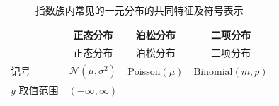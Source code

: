\documentclass[12pt,a4paper,UTF8,twoside]{book}
\theoremstyle{definition}
\theoremstyle{definition}
\theoremstyle{definition}
\theoremstyle{remark}
\begin{document}
\begin{longtable}[]{@{}lccc@{}}
\caption{\label{tab:common-characteristics}
指数族内常见的一元分布的共同特征及符号表示}\tabularnewline
\toprule
\begin{minipage}[b]{0.21\columnwidth}\raggedright
\strut
\end{minipage} & \begin{minipage}[b]{0.22\columnwidth}\centering
正态分布\strut
\end{minipage} & \begin{minipage}[b]{0.22\columnwidth}\centering
泊松分布\strut
\end{minipage} & \begin{minipage}[b]{0.22\columnwidth}\centering
二项分布\strut
\end{minipage}\tabularnewline
\midrule
\endfirsthead
\toprule
\begin{minipage}[b]{0.21\columnwidth}\raggedright
\strut
\end{minipage} & \begin{minipage}[b]{0.22\columnwidth}\centering
正态分布\strut
\end{minipage} & \begin{minipage}[b]{0.22\columnwidth}\centering
泊松分布\strut
\end{minipage} & \begin{minipage}[b]{0.22\columnwidth}\centering
二项分布\strut
\end{minipage}\tabularnewline
\midrule
\endhead
\begin{minipage}[t]{0.21\columnwidth}\raggedright
记号\strut
\end{minipage} & \begin{minipage}[t]{0.22\columnwidth}\centering
\(\mathcal{N}(\mu,\sigma^2)\)\strut
\end{minipage} & \begin{minipage}[t]{0.22\columnwidth}\centering
\(\mathrm{Poisson}(\mu)\)\strut
\end{minipage} & \begin{minipage}[t]{0.22\columnwidth}\centering
\(\mathrm{Binomial}(m,p)\)\strut
\end{minipage}\tabularnewline
\begin{minipage}[t]{0.21\columnwidth}\raggedright
\(y\) 取值范围\strut
\end{minipage} & \begin{minipage}[t]{0.22\columnwidth}\centering
\((-\infty,\infty)\)\strut
\end{minipage} & \begin{minipage}[t]{0.22\columnwidth}\centering

\end{minipage}
\end{longtable}
\end{document}
